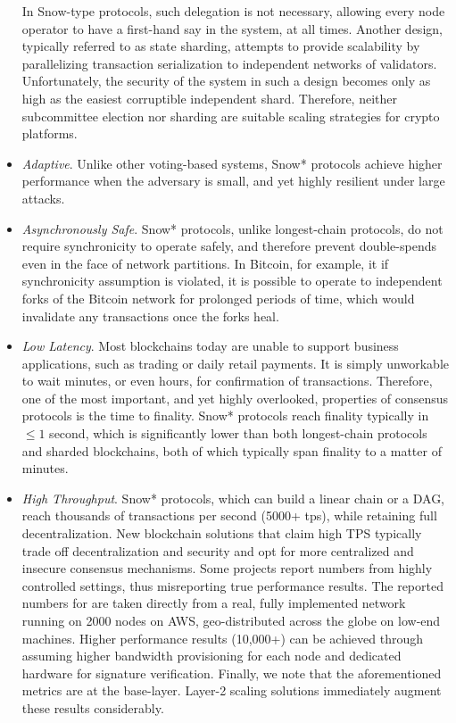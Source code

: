 \documentclass[runningheads]{llncs}
\begin{document}
\begin{itemize}
In Snow-type protocols, such delegation is not necessary, allowing every node operator to have a first-hand say in the system, at all times. Another design, typically referred to as state sharding, attempts to provide scalability by parallelizing transaction serialization to independent networks of validators. Unfortunately, the security of the system in such a design becomes only as high as the easiest corruptible independent shard. Therefore, neither subcommittee election nor sharding are suitable scaling strategies for crypto platforms. 
\item \textit{Adaptive}. Unlike other voting-based systems, Snow* protocols achieve higher performance when the adversary is small, and yet highly resilient under large attacks. 
\item \textit{Asynchronously Safe}. Snow* protocols, unlike longest-chain protocols, do not require synchronicity to operate safely, and therefore prevent double-spends even in the face of network partitions. In Bitcoin, for example, it if synchronicity assumption is violated, it is possible to operate to independent forks of the Bitcoin network for prolonged periods of time, which would invalidate any transactions once the forks heal. 
\item \textit{Low Latency}. Most blockchains today are unable to support business applications, such as trading or daily retail payments. It is simply unworkable to wait minutes, or even hours, for confirmation of transactions. Therefore, one of the most important, and yet highly overlooked, properties of consensus protocols is the time to finality. Snow* protocols reach finality typically in $\leq 1$ second, which is significantly lower than both longest-chain protocols and sharded blockchains, both of which typically span finality to a matter of minutes. 
\item \textit{High Throughput}. Snow* protocols, which can build a linear chain or a DAG, reach thousands of transactions per second (5000+ tps), while retaining full decentralization. New blockchain solutions that claim high TPS typically trade off decentralization and security and opt for more centralized and insecure consensus mechanisms. Some projects report numbers from highly controlled settings, thus misreporting true performance results. The reported numbers for \AVATokenName{} are taken directly from a real, fully implemented \AVAPlatformName{} network running on 2000 nodes on AWS, geo-distributed across the globe on low-end machines. Higher performance results (10,000+) can be achieved through assuming higher bandwidth provisioning for each node and dedicated hardware for signature verification. Finally, we note that the aforementioned metrics are at the base-layer. Layer-2 scaling solutions immediately augment these results considerably. 
\end{itemize}
\end{document}
